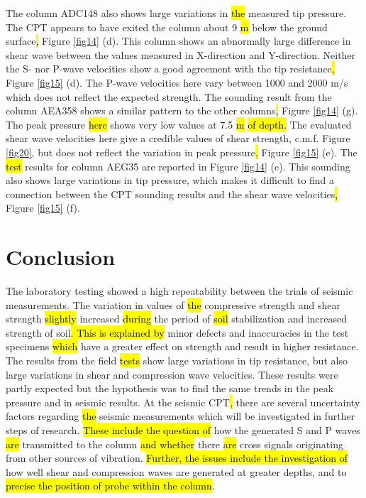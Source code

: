 \documentclass[final,3p,times,onecolumn,authoryear]{elsarticle}
\begin{document}
The column ADC148 also shows large variations in \hl{the }measured tip pressure. The CPT\hl{ }appears to have exited the column about 9 \hl{m} below the ground surface\hl{, }Figure \ref{fig14} (d). This column shows an abnormally large difference in shear wave between the values measured in X-direction and Y-direction. Neither the S- nor P-wave velocities show a good agreement with the tip resistance\hl{, }Figure \ref{fig15} (d). The P-wave velocities here vary between 1000 and 2000 m/s which does not reflect the expected strength. The sounding result from the column AEA358 shows a similar pattern to the other columns\hl{, }Figure \ref{fig14} (g). The peak pressure \hl{here }shows very low values at 7.5 \hl{m}\hl{ of depth. }The evaluated shear wave velocities here give a credible values of shear strength, c.m.f. Figure \ref{fig20}, but does not reflect the variation in peak pressure\hl{, }Figure \ref{fig15} (e). The\hl{ test }results for column AEG35 are reported in Figure \ref{fig14} (e). This sounding also shows large variations in tip pressure, which makes it difficult to find a connection between the CPT sounding results and the shear wave velocities\hl{, }Figure \ref{fig15} (f). 

\section{Conclusion}

The laboratory testing showed a high repeatability between the trials of seismic measurements. The variation in values of \hl{the }compressive strength and shear strength \hl{slightly }increased\hl{ during }the period of \hl{soil }stabilization and increased strength of soil\hl{. This is explained by} minor defects and inaccuracies in the test specimens \hl{which }have a greater effect on strength and result in higher resistance. The results from the field \hl{tests} show large variations in tip resistance, but also large variations in shear and compression wave velocities. These results were partly expected but the hypothesis was to find the same trends in the peak pressure and in seismic results. At the seismic CPT\hl{, }there are several uncertainty factors regarding \hl{the }seismic measurements which will be investigated in further steps of research. \hl{These include the question of }how the generated S and P waves \hl{are }transmitted to the column \hl{and whether} there \hl{are }cross signals originating from other sources of vibration. \hl{Further, the issues include the investigation of} how well shear and compression waves are generated at greater depths, and to \hl{precise the position of probe within the column}.
    
\end{document}
